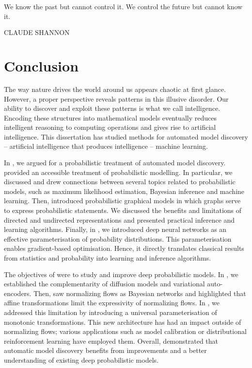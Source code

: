 \null\vfill
{\centering
\parbox{\textwidth}{%
  \raggedright
  {%

  We know the past but cannot control it. We control the future but cannot know it.\par\bigskip
  }
  \raggedleft\MakeUppercase{Claude Shannon}\par%
}}

\vfill\vfill


\chapter{Conclusion}\label{ch:08}
The way nature drives the world around us appears chaotic at first glance. However, a proper perspective reveals patterns in this illusive disorder. Our ability to discover and exploit these patterns is what we call intelligence. Encoding these structures into mathematical models eventually reduces intelligent reasoning to computing operations and gives rise to artificial intelligence. This dissertation has studied methods for automated model discovery -- artificial intelligence that produces intelligence -- machine learning.

In , we argued for a probabilistic treatment of automated model discovery.  provided an accessible treatment of probabilistic modelling. In particular, we discussed and drew connections between several topics related to probabilistic models, such as maximum likelihood estimation, Bayesian inference and machine learning. Then,  introduced probabilistic graphical models in which graphs serve to express probabilistic statements. We discussed the benefits and limitations of directed and undirected representations and presented practical inference and learning algorithms. Finally, in , we introduced deep neural networks as an effective parameterisation of probability distributions. This parameterisation enables gradient-based optimisation. Hence, it directly translates classical results from statistics and probability into learning and inference algorithms.

The objectives of  were to study and improve deep probabilistic models. In , we established the complementarity of diffusion models and variational auto-encoders. Then,  saw normalizing flows as Bayesian networks and highlighted that affine transformations limit the expressivity of normalizing flows. In , we addressed this limitation by introducing a universal parameterisation of monotonic transformations. This new architecture has had an impact outside of normalizing flows; various applications such as model calibration or distributional reinforcement learning have employed them. Overall,  demonstrated that automatic model discovery benefits from improvements and a better understanding of existing deep probabilistic models.

